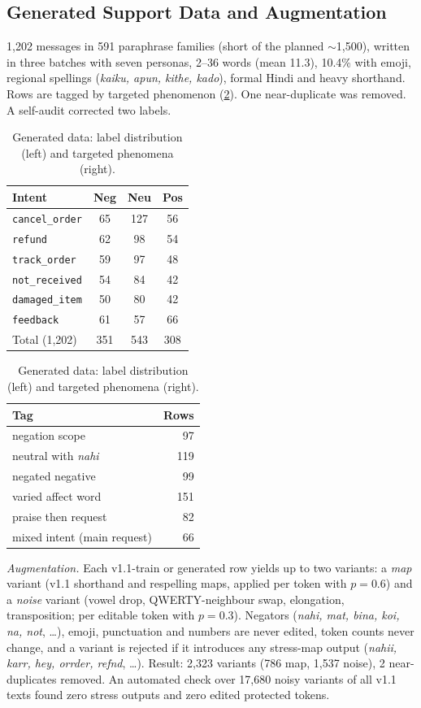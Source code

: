 \documentclass[11pt,a4paper]{article}
\theoremstyle{remark}
\newcommand{\lbl}[1]{\texttt{#1}}
\newcommand{\hi}[1]{\textit{#1}}
\begin{document}
\subsection{Generated Support Data and Augmentation}
1{,}202 messages in 591 paraphrase families (short of the planned $\sim$1{,}500), written in three batches with seven personas, 2--36 words (mean 11.3), 10.4\% with emoji, regional spellings (\hi{kaiku, apun, kithe, kado}), formal Hindi and heavy shorthand. Rows are tagged by targeted phenomenon (\cref{tab:gen}). One near-duplicate was removed. A self-audit corrected two labels.

\begin{table}[h]
\centering\small
\caption{Generated data: label distribution (left) and targeted phenomena (right).}
\label{tab:gen}
\begin{tabular}{@{}lccc@{}}
\toprule
Intent & Neg & Neu & Pos \\
\midrule
\lbl{cancel\_order}  & 65 & 127 & 56 \\
\lbl{refund}         & 62 & 98 & 54 \\
\lbl{track\_order}   & 59 & 97 & 48 \\
\lbl{not\_received}  & 54 & 84 & 42 \\
\lbl{damaged\_item}  & 50 & 80 & 42 \\
\lbl{feedback}       & 61 & 57 & 66 \\
\midrule
Total (1{,}202)      & 351 & 543 & 308 \\
\bottomrule
\end{tabular}
\hspace{1.2em}
\begin{tabular}{@{}lr@{}}
\toprule
Tag & Rows \\
\midrule
negation scope & 97 \\
neutral with \hi{nahi} & 119 \\
negated negative & 99 \\
varied affect word & 151 \\
praise then request & 82 \\
mixed intent (main request) & 66 \\
\bottomrule
\end{tabular}
\end{table}

\emph{Augmentation.} Each v1.1-train or generated row yields up to two variants: a \emph{map} variant (v1.1 shorthand and respelling maps, applied per token with $p{=}0.6$) and a \emph{noise} variant (vowel drop, QWERTY-neighbour swap, elongation, transposition; per editable token with $p{=}0.3$). Negators (\hi{nahi, mat, bina, koi, na, not}, \dots), emoji, punctuation and numbers are never edited, token counts never change, and a variant is rejected if it introduces any stress-map output (\hi{nahii, karr, hey, orrder, refnd}, \dots). Result: 2{,}323 variants (786 map, 1{,}537 noise), 2 near-duplicates removed. An automated check over 17{,}680 noisy variants of all v1.1 texts found zero stress outputs and zero edited protected tokens.
\end{document}
